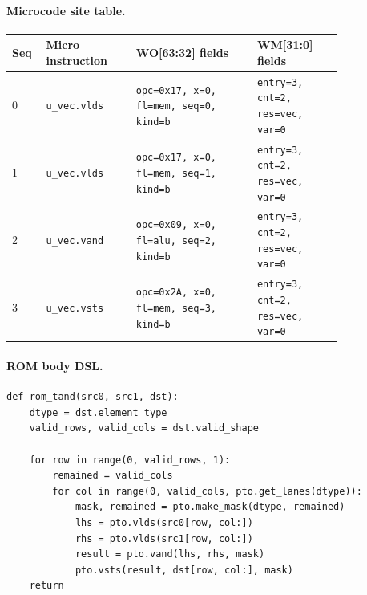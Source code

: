 \paragraph{Microcode site table.}
{\scriptsize
\begin{longtable}{@{}R{0.055\linewidth}L{0.23\linewidth}L{0.31\linewidth}L{0.22\linewidth}@{}}
\toprule
Seq & Micro instruction & WO[63:32] fields & WM[31:0] fields \\
 & \texttt{u\_vec.vlds} & \texttt{opc=0x17, x=0, fl=mem, seq=0, kind=b} & \texttt{entry=3, cnt=2, res=vec, var=0} \\
1 & \texttt{u\_vec.vlds} & \texttt{opc=0x17, x=0, fl=mem, seq=1, kind=b} & \texttt{entry=3, cnt=2, res=vec, var=0} \\
2 & \texttt{u\_vec.vand} & \texttt{opc=0x09, x=0, fl=alu, seq=2, kind=b} & \texttt{entry=3, cnt=2, res=vec, var=0} \\
3 & \texttt{u\_vec.vsts} & \texttt{opc=0x2A, x=0, fl=mem, seq=3, kind=b} & \texttt{entry=3, cnt=2, res=vec, var=0} \\
\bottomrule
\end{longtable}
}
\paragraph{ROM body DSL.}
\begin{lstlisting}[style=ptocode]
def rom_tand(src0, src1, dst):
    dtype = dst.element_type
    valid_rows, valid_cols = dst.valid_shape

    for row in range(0, valid_rows, 1):
        remained = valid_cols
        for col in range(0, valid_cols, pto.get_lanes(dtype)):
            mask, remained = pto.make_mask(dtype, remained)
            lhs = pto.vlds(src0[row, col:])
            rhs = pto.vlds(src1[row, col:])
            result = pto.vand(lhs, rhs, mask)
            pto.vsts(result, dst[row, col:], mask)
    return
\end{lstlisting}
\Needspace{0.34\textheight}
